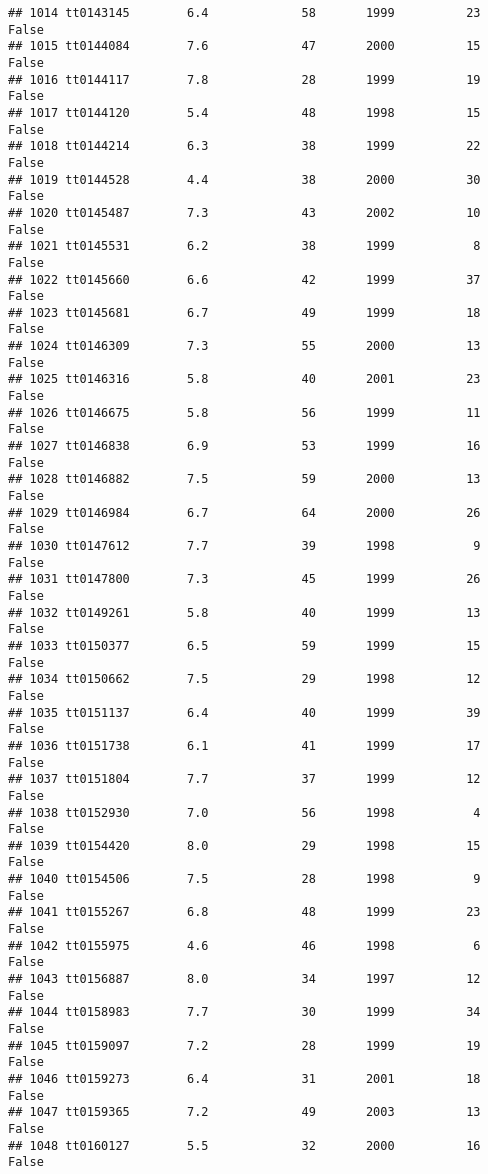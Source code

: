 \documentclass[
]{article}
\begin{document}
\begin{verbatim}
## 1014 tt0143145        6.4             58       1999          23   False
## 1015 tt0144084        7.6             47       2000          15   False
## 1016 tt0144117        7.8             28       1999          19   False
## 1017 tt0144120        5.4             48       1998          15   False
## 1018 tt0144214        6.3             38       1999          22   False
## 1019 tt0144528        4.4             38       2000          30   False
## 1020 tt0145487        7.3             43       2002          10   False
## 1021 tt0145531        6.2             38       1999           8   False
## 1022 tt0145660        6.6             42       1999          37   False
## 1023 tt0145681        6.7             49       1999          18   False
## 1024 tt0146309        7.3             55       2000          13   False
## 1025 tt0146316        5.8             40       2001          23   False
## 1026 tt0146675        5.8             56       1999          11   False
## 1027 tt0146838        6.9             53       1999          16   False
## 1028 tt0146882        7.5             59       2000          13   False
## 1029 tt0146984        6.7             64       2000          26   False
## 1030 tt0147612        7.7             39       1998           9   False
## 1031 tt0147800        7.3             45       1999          26   False
## 1032 tt0149261        5.8             40       1999          13   False
## 1033 tt0150377        6.5             59       1999          15   False
## 1034 tt0150662        7.5             29       1998          12   False
## 1035 tt0151137        6.4             40       1999          39   False
## 1036 tt0151738        6.1             41       1999          17   False
## 1037 tt0151804        7.7             37       1999          12   False
## 1038 tt0152930        7.0             56       1998           4   False
## 1039 tt0154420        8.0             29       1998          15   False
## 1040 tt0154506        7.5             28       1998           9   False
## 1041 tt0155267        6.8             48       1999          23   False
## 1042 tt0155975        4.6             46       1998           6   False
## 1043 tt0156887        8.0             34       1997          12   False
## 1044 tt0158983        7.7             30       1999          34   False
## 1045 tt0159097        7.2             28       1999          19   False
## 1046 tt0159273        6.4             31       2001          18   False
## 1047 tt0159365        7.2             49       2003          13   False
## 1048 tt0160127        5.5             32       2000          16   False

\end{verbatim}
\end{document}
